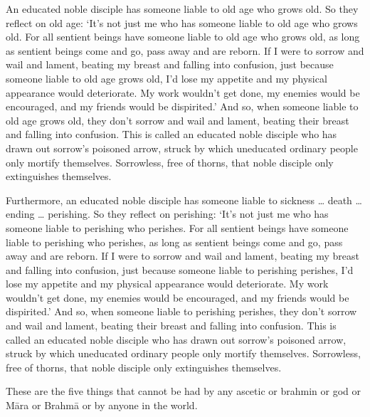 \documentclass[12pt,openany]{book}%
\begin{document}
An educated noble disciple has someone liable to old age who grows old. So they reflect on old age: ‘It’s not just me who has someone liable to old age who grows old. For all sentient beings have someone liable to old age who grows old, as long as sentient beings come and go, pass away and are reborn. If I were to sorrow and wail and lament, beating my breast and falling into confusion, just because someone liable to old age grows old, I’d lose my appetite and my physical appearance would deteriorate. My work wouldn’t get done, my enemies would be encouraged, and my friends would be dispirited.’ And so, when someone liable to old age grows old, they don’t sorrow and wail and lament, beating their breast and falling into confusion. This is called an educated noble disciple who has drawn out sorrow’s poisoned arrow, struck by which uneducated ordinary people only mortify themselves. Sorrowless, free of thorns, that noble disciple only extinguishes themselves. 

Furthermore, an educated noble disciple has someone liable to sickness … death … ending … perishing. So they reflect on perishing: ‘It’s not just me who has someone liable to perishing who perishes. For all sentient beings have someone liable to perishing who perishes, as long as sentient beings come and go, pass away and are reborn. If I were to sorrow and wail and lament, beating my breast and falling into confusion, just because someone liable to perishing perishes, I’d lose my appetite and my physical appearance would deteriorate. My work wouldn’t get done, my enemies would be encouraged, and my friends would be dispirited.’ And so, when someone liable to perishing perishes, they don’t sorrow and wail and lament, beating their breast and falling into confusion. This is called an educated noble disciple who has drawn out sorrow’s poisoned arrow, struck by which uneducated ordinary people only mortify themselves. Sorrowless, free of thorns, that noble disciple only extinguishes themselves. 

These are the five things that cannot be had by any ascetic or brahmin or god or \textsanskrit{Māra} or \textsanskrit{Brahmā} or by anyone in the world. 
\end{document}
